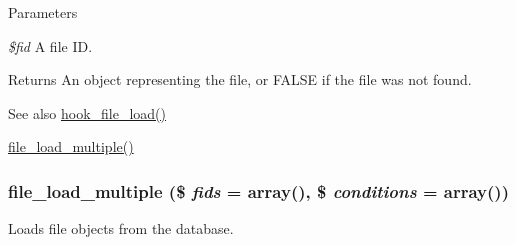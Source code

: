 \begin{DoxyParams}{Parameters}
\item[{\em \$fid}]A file ID.\end{DoxyParams}
\begin{DoxyReturn}{Returns}
An object representing the file, or FALSE if the file was not found.
\end{DoxyReturn}
\begin{DoxySeeAlso}{See also}
\hyperlink{group__hooks_ga9f6bf6919600b83a565421f6a7faf678}{hook\_\-file\_\-load()} 

\hyperlink{group__file_ga32afa29695b6da3f5d86cad18f063bfc}{file\_\-load\_\-multiple()} 
\end{DoxySeeAlso}
\hypertarget{group__file_ga32afa29695b6da3f5d86cad18f063bfc}{
\subsubsection[{file\_\-load\_\-multiple}]{\setlength{\rightskip}{0pt plus 5cm}file\_\-load\_\-multiple (\$ {\em fids} = {\ttfamily array()}, \/  \$ {\em conditions} = {\ttfamily array()})}}
\label{group__file_ga32afa29695b6da3f5d86cad18f063bfc}
Loads file objects from the database.


